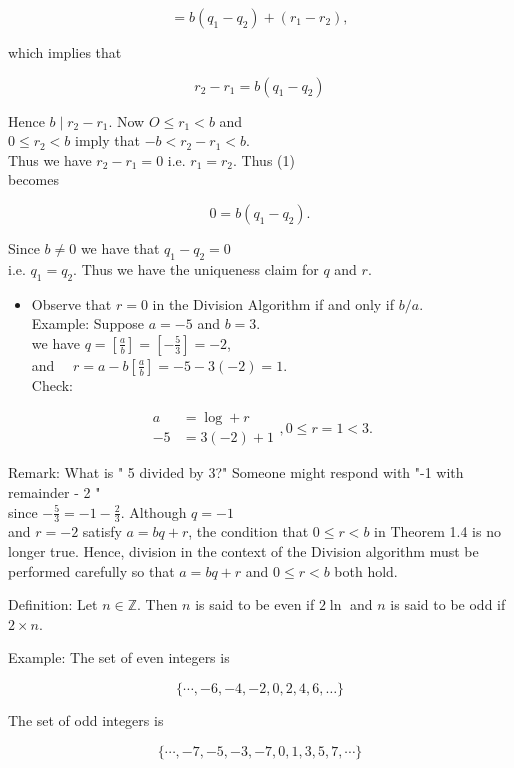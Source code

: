 \documentclass[10pt]{article}
\begin{document}
$$
=b\left(q_{1}-q_{2}\right)+\left(r_{1}-r_{2}\right),
$$

which implies that

$$
r_{2}-r_{1}=b\left(q_{1}-q_{2}\right)
$$

Hence $b \mid r_{2}-r_{1}$. Now $O \leqslant r_{1}<b$ and\\
$0 \leqslant r_{2}<b$ imply that $-b<r_{2}-r_{1}<b$.\\
Thus we have $r_{2}-r_{1}=0$ i.e. $r_{1}=r_{2}$. Thus (1)\\
becomes

$$
0=b\left(q_{1}-q_{2}\right) .
$$

Since $b \neq 0$ we have that $q_{1}-q_{2}=0$\\
i.e. $q_{1}=q_{2}$. Thus we have the uniqueness claim for $q$ and $r$.

\begin{itemize}
  \item Observe that $r=0$ in the Division Algorithm if and only if $b / a$.\\
Example: Suppose $a=-5$ and $b=3$.\\
we have $q=\left[\frac{a}{b}\right]=\left[-\frac{5}{3}\right]=-2$,\\
and $\quad r=a-b\left[\frac{a}{b}\right]=-5-3(-2)=1$.\\
Check:
\end{itemize}

$$
\begin{aligned}
a & =\log +r \\
-5 & =3(-2)+1
\end{aligned}, 0 \leqslant r=1<3 .
$$

Remark: What is " 5 divided by 3?" Someone might respond with "-1 with remainder - 2 "\\
since $-\frac{5}{3}=-1-\frac{2}{3}$. Although $q=-1$\\
and $r=-2$ satisfy $a=b q+r$, the condition that $0 \leqslant r<b$ in Theorem 1.4 is no longer true. Hence, division in the context of the Division algorithm must be performed carefully so that $a=b q+r$ and $0 \leq r<b$ both hold.

Definition: Let $n \in \mathbb{Z}$. Then $n$ is said to be even if $2 \ln$ and $n$ is said to be odd if $2 \times n$.

Example: The set of even integers is

$$
\{\cdots,-6,-4,-2,0,2,4,6, \ldots\}
$$

The set of odd integers is

$$
\{\cdots,-7,-5,-3,-7,0,1,3,5,7, \cdots\}
$$
\end{document}
